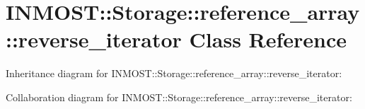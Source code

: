 \hypertarget{classINMOST_1_1Storage_1_1reference__array_1_1reverse__iterator}{\section{I\-N\-M\-O\-S\-T\-:\-:Storage\-:\-:reference\-\_\-array\-:\-:reverse\-\_\-iterator Class Reference}
\label{classINMOST_1_1Storage_1_1reference__array_1_1reverse__iterator}
}


Inheritance diagram for I\-N\-M\-O\-S\-T\-:\-:Storage\-:\-:reference\-\_\-array\-:\-:reverse\-\_\-iterator\-:


Collaboration diagram for I\-N\-M\-O\-S\-T\-:\-:Storage\-:\-:reference\-\_\-array\-:\-:reverse\-\_\-iterator\-:
